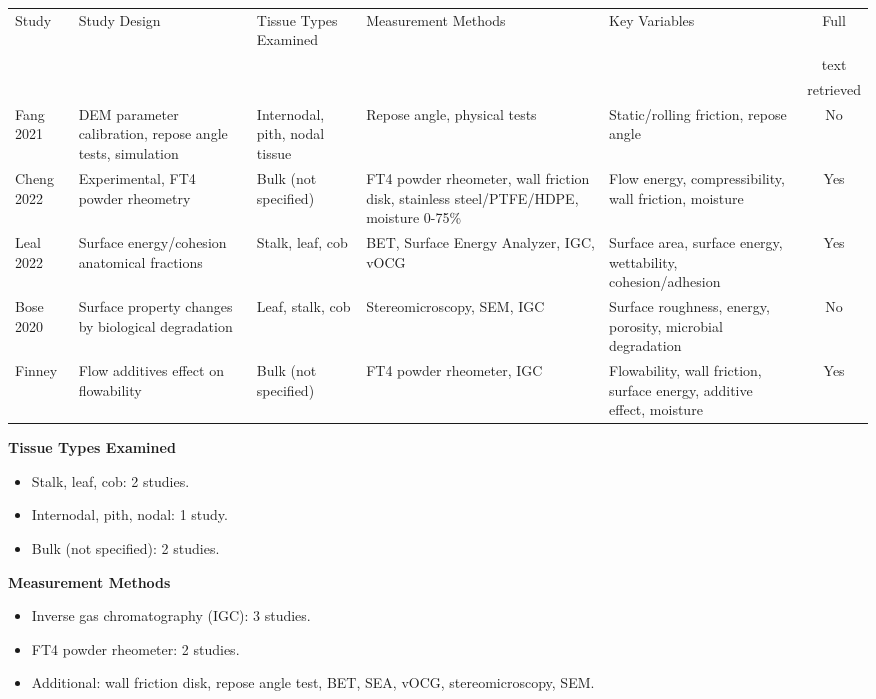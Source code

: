 \documentclass[xcolor=dvipsnames,10pt,hidelinks]{article}
\begin{document}
\begin{itemize}
\begingroup\tiny
\begin{center}
\begin{tabularx}{\linewidth}{lXlXXc}
Study & Study Design & Tissue Types Examined & Measurement Methods & Key Variables & Full\\
 &  &  &  &  & text\\
 &  &  &  &  & retrieved\\
\hline
Fang 2021 & DEM parameter calibration, repose angle tests, simulation & Internodal, pith, nodal tissue & Repose angle, physical tests & Static/rolling friction, repose angle & No\\
Cheng 2022 & Experimental, FT4 powder rheometry & Bulk (not specified) & FT4 powder rheometer, wall friction disk, stainless steel/PTFE/HDPE, moisture 0-75\% & Flow energy, compressibility, wall friction, moisture & Yes\\
Leal 2022 & Surface energy/cohesion anatomical fractions & Stalk, leaf, cob & BET, Surface Energy Analyzer, IGC, vOCG & Surface area, surface energy, wettability, cohesion/adhesion & Yes\\
Bose 2020 & Surface property changes by biological degradation & Leaf, stalk, cob & Stereomicroscopy, SEM, IGC & Surface roughness, energy, porosity, microbial degradation & No\\
Finney & Flow additives effect on flowability & Bulk (not specified) & FT4 powder rheometer, IGC & Flowability, wall friction, surface energy, additive effect, moisture & Yes\\
\end{tabularx}
\end{center}
\endgroup

\textbf{\textbf{Tissue Types Examined}}
\begin{itemize}
\item Stalk, leaf, cob: 2 studies.
\item Internodal, pith, nodal: 1 study.
\item Bulk (not specified): 2 studies.
\end{itemize}

\textbf{\textbf{Measurement Methods}}
\begin{itemize}
\item Inverse gas chromatography (IGC): 3 studies.
\item FT4 powder rheometer: 2 studies.
\item Additional: wall friction disk, repose angle test, BET, SEA, vOCG, stereomicroscopy, SEM.
\end{itemize}


\end{itemize}
\end{document}
